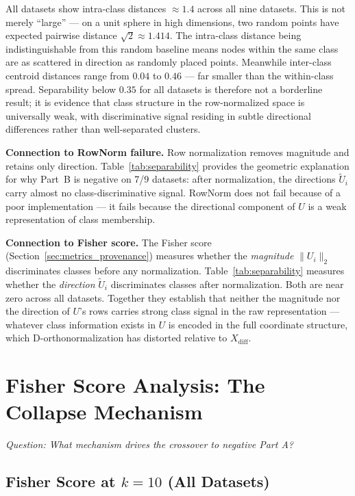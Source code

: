 \documentclass[11pt]{article}
\begin{document}
All datasets show intra-class distances $\approx 1.4$ across all nine datasets.
This is not merely ``large'' --- on a unit sphere in high dimensions, two random points
have expected pairwise distance $\sqrt{2} \approx 1.414$.  The intra-class distance
being indistinguishable from this random baseline means nodes within the same class
are as scattered in direction as randomly placed points.  Meanwhile inter-class
centroid distances range from $0.04$ to $0.46$ --- far smaller than the within-class
spread.  Separability below $0.35$ for all datasets is therefore not a borderline
result; it is evidence that class structure in the row-normalized space is universally
weak, with discriminative signal residing in subtle directional differences rather
than well-separated clusters.

\textbf{Connection to RowNorm failure.}
Row normalization removes magnitude and retains only direction.
Table~\ref{tab:separability} provides the geometric explanation for why Part~B is
negative on 7/9 datasets: after normalization, the directions $\tilde{U}_i$ carry
almost no class-discriminative signal.  RowNorm does not fail because of a poor
implementation --- it fails because the directional component of $U$ is a weak
representation of class membership.

\textbf{Connection to Fisher score.}
The Fisher score (Section~\ref{sec:metrics_provenance}) measures whether the
\emph{magnitude} $\|U_i\|_2$ discriminates classes before any normalization.
Table~\ref{tab:separability} measures whether the \emph{direction} $\tilde{U}_i$
discriminates classes after normalization.  Both are near zero across all datasets.
Together they establish that neither the magnitude nor the direction of $U$'s rows
carries strong class signal in the raw representation --- whatever class information
exists in $U$ is encoded in the full coordinate structure, which D-orthonormalization
has distorted relative to $X_{\mathrm{diff}}$.

\section{Fisher Score Analysis: The Collapse Mechanism}
\textit{Question: What mechanism drives the crossover to negative Part A?}
\label{sec:fisher}

\subsection{Fisher Score at $k = 10$ (All Datasets)}
\end{document}
